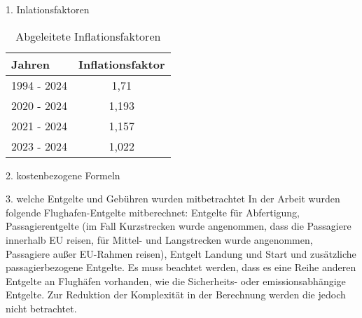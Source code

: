 1. Inlationsfaktoren
\begin{table}[h]
	\begin{center}
    \caption{Abgeleitete Inflationsfaktoren}
	\label{Inflationsfaktoren}
	\begin{tabular}{|l|c|}
		\hline
		Jahren & \textbf{Inflationsfaktor} \\ \hline
		1994 - 2024 & 1,71 \\ \hline
		2020 - 2024 & 1,193 \\ \hline
        2021 - 2024 & 1,157 \\ \hline
        2023 - 2024 & 1,022 \\ \hline
	\end{tabular}
    \end{center}
\end{table}

2. kostenbezogene Formeln

3. welche Entgelte und Gebühren wurden mitbetrachtet
In der Arbeit wurden folgende Flughafen-Entgelte mitberechnet: Entgelte für Abfertigung, Passagierentgelte (im Fall Kurzstrecken wurde angenommen,
dass die Passagiere innerhalb EU reisen, für Mittel- und Langstrecken wurde angenommen, Passagiere außer EU-Rahmen reisen), Entgelt Landung und Start
und zusätzliche passagierbezogene Entgelte. Es muss beachtet werden, dass es eine Reihe anderen Entgelte an Flughäfen vorhanden, 
wie die Sicherheits- oder emissionsabhängige Entgelte. Zur Reduktion der Komplexität in der Berechnung werden die jedoch nicht betrachtet.